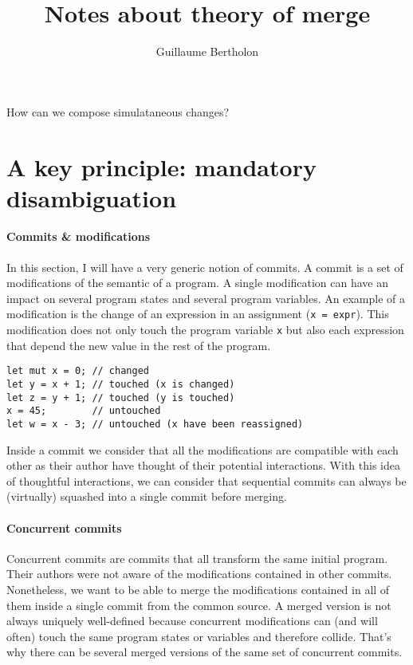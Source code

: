 \documentclass[a4paper,10pt]{article}
\title{Notes about theory of merge}
\author{Guillaume Bertholon}
\begin{document}
\maketitle

How can we compose simulataneous changes?

\section{A key principle: mandatory disambiguation}
\paragraph{Commits \& modifications}
In this section, I will have a very generic notion of commits. A commit is a set of modifications of the semantic of a program. A single modification
can have an impact on several program states and several program variables.
An example of a modification is the change of an expression in an assignment (\lstinline{x = expr}). This modification does not only touch the program variable \lstinline{x} but also each expression that depend the new value in the rest of the program.
\begin{lstlisting}[caption=Modification of $x$]
let mut x = 0; // changed
let y = x + 1; // touched (x is changed)
let z = y + 1; // touched (y is touched)
x = 45;        // untouched
let w = x - 3; // untouched (x have been reassigned)
\end{lstlisting}
Inside a commit we consider that all the modifications are compatible with each
other as their author have thought of their potential interactions.
With this idea of thoughtful interactions, we can consider that sequential commits can always be (virtually) squashed into a single commit before merging.

\paragraph{Concurrent commits}
Concurrent commits are commits that all transform the same initial program. Their authors were not aware of the modifications contained in other commits. Nonetheless, we want to be able to merge the modifications contained in all of them inside a single commit from the common source. A merged version is not always uniquely well-defined because concurrent modifications can (and will often) touch the same program states or variables and therefore collide. That's why there can be several merged versions of the same set of concurrent commits.
\end{document}
